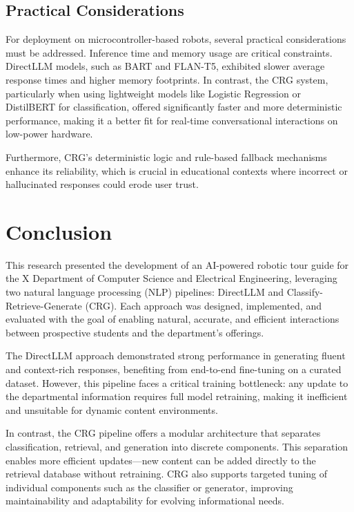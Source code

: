 \documentclass[conference]{IEEEtran}
\begin{document}
\subsection{Practical Considerations}
For deployment on microcontroller-based robots, several practical considerations must be addressed. 
Inference time and memory usage are critical constraints. 
DirectLLM models, such as BART and FLAN-T5, exhibited slower average response times and higher memory footprints. 
In contrast, the CRG system, particularly when using lightweight models like Logistic Regression or DistilBERT for classification, offered significantly faster and more deterministic performance, making it a better fit for real-time conversational interactions on low-power hardware.

Furthermore, CRG's deterministic logic and rule-based fallback mechanisms enhance its reliability, which is crucial in educational contexts where incorrect or hallucinated responses could erode user trust.

\section{Conclusion}
This research presented the development of an AI-powered robotic tour guide for the X Department of Computer Science and Electrical Engineering, leveraging two natural language processing (NLP) pipelines: DirectLLM and Classify-Retrieve-Generate (CRG). 
Each approach was designed, implemented, and evaluated with the goal of enabling natural, accurate, and efficient interactions between prospective students and the department's offerings.

The DirectLLM approach demonstrated strong performance in generating fluent and context-rich responses, benefiting from end-to-end fine-tuning on a curated dataset. 
However, this pipeline faces a critical training bottleneck: any update to the departmental information requires full model retraining, making it inefficient and unsuitable for dynamic content environments.

In contrast, the CRG pipeline offers a modular architecture that separates classification, retrieval, and generation into discrete components. 
This separation enables more efficient updates—new content can be added directly to the retrieval database without retraining. 
CRG also supports targeted tuning of individual components such as the classifier or generator, improving maintainability and adaptability for evolving informational needs.
\end{document}
